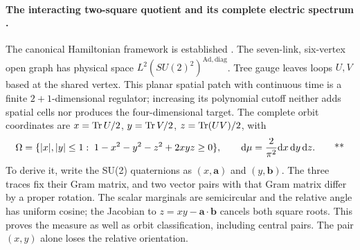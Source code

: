 \paragraph{The interacting two-square quotient and its complete electric spectrum \workstar.}
The canonical Hamiltonian framework is established \cite{kogut1975hamiltonian}.
The seven-link, six-vertex open graph has physical space
\(L^2(SU(2)^2)^{\mathrm{Ad,diag}}\).  Tree gauge leaves loops \(U,V\) based
at the shared vertex.  This planar spatial patch with continuous time is a
finite \(2+1\)-dimensional regulator; increasing its polynomial cutoff neither
adds spatial cells nor produces the four-dimensional target.
The complete orbit coordinates are
\(x=\operatorname{Tr} U/2\), \(y=\operatorname{Tr} V/2\), \(z=\operatorname{Tr}(UV)/2\), with
\begin{equation}
 \Omega=\{ |x|,|y|\le1:\;1-x^2-y^2-z^2+2xyz\ge0\},
 \qquad\mathrm{d}\mu=\frac2{\pi^2}\mathrm{d} x\,\mathrm{d} y\,\mathrm{d} z.
 \qquad\text{**}\label{early:quotient}
\end{equation}
To derive it, write the SU(2) quaternions as \((x,\boldsymbol a)\) and
\((y,\boldsymbol b)\).  The three traces fix their Gram matrix, and two
vector pairs with that Gram matrix differ by a proper rotation.  The scalar
marginals are semicircular and the relative angle has uniform cosine;
the Jacobian to \(z=xy-\boldsymbol a\cdot\boldsymbol b\) cancels both square
roots.  This proves the measure as well as orbit classification, including
central pairs.  The pair \((x,y)\) alone loses the relative orientation.

